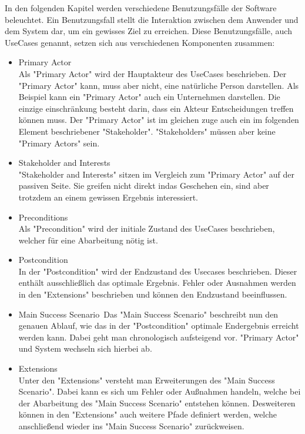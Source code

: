 \documentclass[../../Pflichtenheft.tex]{subfiles}
\begin{document}
In den folgenden Kapitel werden verschiedene Benutzungsfälle der Software beleuchtet.
Ein Benutzungsfall stellt die Interaktion zwischen dem Anwender und dem System dar, um ein gewisses Ziel zu erreichen.
Diese Benutzungsfälle, auch UseCases genannt, setzen sich aus verschiedenen Komponenten zusammen:
    \begin{itemize}
        \item Primary Actor\\
            Als "Primary Actor" wird der Hauptakteur des UseCases beschrieben.
            Der "Primary Actor" kann, muss aber nicht, eine natürliche Person darstellen. Als Beispiel kann ein "Primary Actor" auch
            ein Unternehmen darstellen. Die einzige einschränkung besteht darin, dass ein Akteur Entscheidungen treffen können muss.
            Der "Primary Actor" ist im gleichen zuge auch ein im folgenden Element beschriebener "Stakeholder". "Stakeholders" müssen
            aber keine "Primary Actors" sein.
        \item Stakeholder and Interests\\
            "Stakeholder and Interests" sitzen im Vergleich zum "Primary Actor" auf der passiven Seite. Sie greifen nicht direkt
            indas Geschehen ein, sind aber trotzdem an einem gewissen Ergebnis interessiert.
        \item Preconditions\\
            Als "Precondition" wird der initiale Zustand des UseCases beschrieben, welcher für eine Abarbeitung nötig ist.
        \item Postcondition\\
            In der "Postcondition" wird der Endzustand des Usecases beschrieben. Dieser enthält ausschließlich das optimale Ergebnis.
            Fehler oder Ausnahmen werden in den "Extensions" beschrieben und können den Endzustand beeinflussen.
        \item Main Success Scenario\
            Das "Main Success Scenario" beschreibt nun den genauen Ablauf, wie das in der "Postcondition" optimale Endergebnis erreicht werden kann.
            Dabei geht man chronologisch aufsteigend vor. "Primary Actor" und System wechseln sich hierbei ab.
        \item Extensions\\
            Unter den "Extensions" versteht man Erweiterungen des "Main Success Scenario". Dabei kann es sich um Fehler oder Außnahmen handeln,
            welche bei der Abarbeitung des "Main Success Scenario" entstehen können. Desweiteren können in den "Extensions" auch
            weitere Pfade definiert werden, welche anschließend wieder ins "Main Success Scenario"  zurückweisen.
    \end{itemize}
\end{document}
